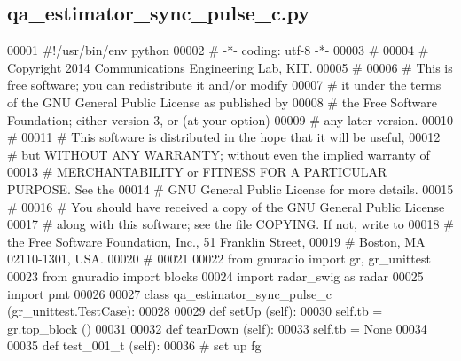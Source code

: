 \subsection{qa\+\_\+estimator\+\_\+sync\+\_\+pulse\+\_\+c.\+py}
\label{qa__estimator__sync__pulse__c_8py_source}

\begin{DoxyCode}
00001 \textcolor{comment}{#!/usr/bin/env python}
00002 \textcolor{comment}{# -*- coding: utf-8 -*-}
00003 \textcolor{comment}{# }
00004 \textcolor{comment}{# Copyright 2014 Communications Engineering Lab, KIT.}
00005 \textcolor{comment}{# }
00006 \textcolor{comment}{# This is free software; you can redistribute it and/or modify}
00007 \textcolor{comment}{# it under the terms of the GNU General Public License as published by}
00008 \textcolor{comment}{# the Free Software Foundation; either version 3, or (at your option)}
00009 \textcolor{comment}{# any later version.}
00010 \textcolor{comment}{# }
00011 \textcolor{comment}{# This software is distributed in the hope that it will be useful,}
00012 \textcolor{comment}{# but WITHOUT ANY WARRANTY; without even the implied warranty of}
00013 \textcolor{comment}{# MERCHANTABILITY or FITNESS FOR A PARTICULAR PURPOSE.  See the}
00014 \textcolor{comment}{# GNU General Public License for more details.}
00015 \textcolor{comment}{# }
00016 \textcolor{comment}{# You should have received a copy of the GNU General Public License}
00017 \textcolor{comment}{# along with this software; see the file COPYING.  If not, write to}
00018 \textcolor{comment}{# the Free Software Foundation, Inc., 51 Franklin Street,}
00019 \textcolor{comment}{# Boston, MA 02110-1301, USA.}
00020 \textcolor{comment}{# }
00021 
00022 \textcolor{keyword}{from} gnuradio \textcolor{keyword}{import} gr, gr\_unittest
00023 \textcolor{keyword}{from} gnuradio \textcolor{keyword}{import} blocks
00024 \textcolor{keyword}{import} radar\_swig \textcolor{keyword}{as} radar
00025 \textcolor{keyword}{import} pmt
00026 
00027 \textcolor{keyword}{class }qa_estimator_sync_pulse_c (gr\_unittest.TestCase):
00028 
00029     \textcolor{keyword}{def }setUp (self):
00030         self.tb = gr.top\_block ()
00031 
00032     \textcolor{keyword}{def }tearDown (self):
00033         self.tb = \textcolor{keywordtype}{None}
00034 
00035     \textcolor{keyword}{def }test_001_t (self):
00036         \textcolor{comment}{# set up fg}

\end{DoxyCode}
